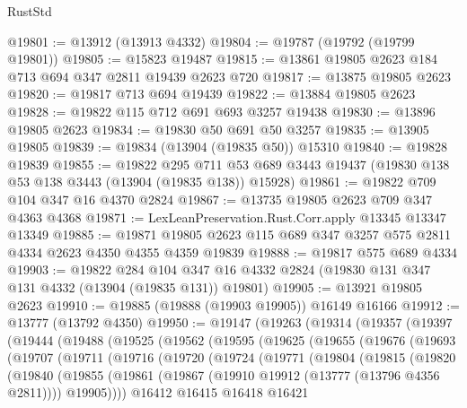 \begin{lexlean}{RustStd}
\begin{coremodule}
@19801 := @13912 (@13913 @4332)
@19804 := @19787 (@19792 (@19799 @19801))
@19805 := @15823 @19487
@19815 := @13861 @19805 @2623 @184 @713 @694 @347 @2811 @19439 @2623 @720
@19817 := @13875 @19805 @2623
@19820 := @19817 @713 @694 @19439
@19822 := @13884 @19805 @2623
@19828 := @19822 @115 @712 @691 @693 @3257 @19438
@19830 := @13896 @19805 @2623
@19834 := @19830 @50 @691 @50 @3257
@19835 := @13905 @19805
@19839 := @19834 (@13904 (@19835 @50)) @15310
@19840 := @19828 @19839
@19855 := @19822
    @295
    @711
    @53
    @689
    @3443
    @19437
    (@19830 @138 @53 @138 @3443 (@13904 (@19835 @138)) @15928)
@19861 := @19822 @709 @104 @347 @16 @4370 @2824
@19867 := @13735 @19805 @2623 @709 @347 @4363 @4368
@19871 := LexLeanPreservation.Rust.Corr.apply @13345 @13347 @13349
@19885 := @19871 @19805 @2623 @115 @689 @347 @3257 @575 @2811 @4334 @2623 @4350 @4355 @4359 @19839
@19888 := @19817 @575 @689 @4334
@19903 := @19822
    @284
    @104
    @347
    @16
    @4332
    @2824
    (@19830 @131 @347 @131 @4332 (@13904 (@19835 @131)) @19801)
@19905 := @13921 @19805 @2623
@19910 := @19885 (@19888 (@19903 @19905)) @16149 @16166
@19912 := @13777 (@13792 @4350)
@19950 := @19147
    (@19263
      (@19314
        (@19357
          (@19397
            (@19444
              (@19488
                (@19525
                  (@19562
                    (@19595
                      (@19625
                        (@19655
                          (@19676
                            (@19693
                              (@19707
                                (@19711
                                  (@19716
                                    (@19720
                                      (@19724
                                        (@19771
                                          (@19804
                                            (@19815
                                              (@19820
                                                (@19840
                                                  (@19855
                                                    (@19861
                                                      (@19867
                                                        (@19910
                                                          @19912
                                                          (@13777 (@13796 @4356 @2811))))
                                                      @19905))))
                                              @16412
                                              @16415
                                              @16418
                                              @16421

\end{coremodule}
\end{lexlean}
